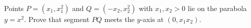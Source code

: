 Points $P=(x_1,x_1^2)$ and $Q=(-x_2,x_2^2)$ with $x_1,x_2>0$ lie on the parabola $y=x^2$. Prove that segment $PQ$ meets the $y$-axis at $(0,x_1x_2)$.
